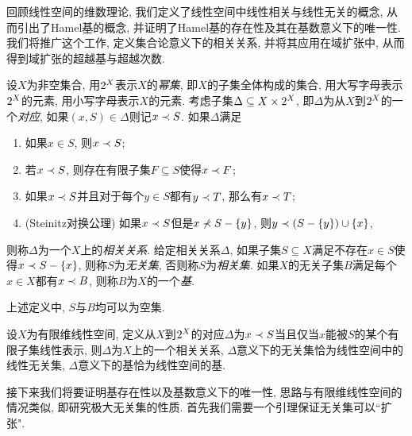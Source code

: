 
回顾线性空间的维数理论, 我们定义了线性空间中线性相关与线性无关的概念, 从而引出了Hamel基的概念, 并证明了Hamel基的存在性\footnotemark 及其在基数意义下的唯一性. 我们将推广这个工作, 定义集合论意义下的相关关系, 并将其应用在域扩张中, 从而得到域扩张的超越基与超越次数.

\begin{definition}
  设$X$为非空集合, 用$2^{X}$表示$X$的\emph{幂集}, 即$X$的子集全体构成的集合, 用大写字母表示$2^{X}$的元素, 用小写字母表示$X$的元素. 考虑子集$\Delta\subseteq X\times 2^{X}$, 即$\Delta$为从$X$到$2^{X}$的一个\emph{对应}, 如果$(x, S)\in \Delta$则记$x\prec S$. 如果$\Delta$满足
  \begin{enumerate}
    \item\label{enum:dependaxiom1} 如果$x\in S$, 则$x\prec S$;
    \item\label{enum:dependaxiom2} 若$x\prec S$, 则存在有限子集$F\subseteq S$使得$x\prec F$;
    \item\label{enum:dependaxiom3} 如果$x\prec S$并且对于每个$y\in S$都有$y\prec T$, 那么有$x\prec T$;
    \item\label{enum:dependaxiom4} (Steinitz对换公理) 如果$x\prec S$但是$x\nprec S-\{y\}$, 则$y\prec (S-\{y\})\cup\{x\}$,
  \end{enumerate}
  则称$\Delta$为一个$X$上的\emph{相关关系}. 给定相关关系$\Delta$, 如果子集$S\subseteq X$满足不存在$x\in S$使得$x\prec S-\{x\}$, 则称$S$为\emph{无关集}, 否则称$S$为\emph{相关集}. 如果$X$的无关子集$B$满足每个$x\in X$都有$x\prec B$, 则称$B$为$X$的一个\emph{基}.
\end{definition}

\begin{remark}
  上述定义中, $S$与$B$均可以为空集.
\end{remark}

\begin{example}
  设$X$为有限维线性空间, 定义从$X$到$2^{X}$的对应$\Delta$为$x\prec S$当且仅当$x$能被$S$的某个有限子集线性表示, 则$\Delta$为$X$上的一个相关关系, $\Delta$意义下的无关集恰为线性空间中的线性无关集, $\Delta$意义下的基恰为线性空间的基.
\end{example}

接下来我们将要证明基存在性以及基数意义下的唯一性, 思路与有限维线性空间的情况类似, 即研究极大无关集的性质. 首先我们需要一个引理保证无关集可以``扩张".

